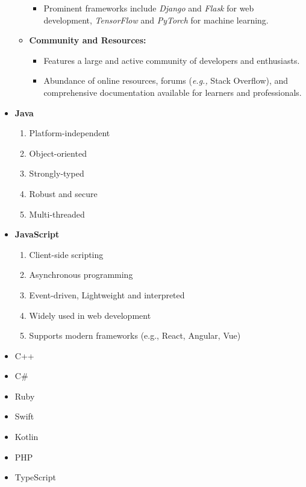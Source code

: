 \documentclass{article}
\begin{document}
\begin{itemize}
\begin{itemize}
\begin{itemize}
                        \item Prominent frameworks include \textit{Django} and \textit{Flask} for web development, \textit{TensorFlow} and \textit{PyTorch} for machine learning.
                    \end{itemize}
              \item \textbf{Community and Resources:}
                    \begin{itemize}
                        \item Features a large and active community of developers and enthusiasts.
                        \item Abundance of online resources, forums (\textit{e.g.,} Stack Overflow), and comprehensive documentation available for learners and professionals.
                    \end{itemize}
          \end{itemize}
          
    \item \textbf {Java}
    \begin{enumerate}[label=\roman*.]
        \item Platform-independent
        \item Object-oriented
        \item Strongly-typed
        \item Robust and secure
        \item Multi-threaded
    \end{enumerate}
    
    \item \textbf {JavaScript}
    \begin{enumerate}[label=\roman*.,start=6]
        \item Client-side scripting
        \item Asynchronous programming
        \item Event-driven, Lightweight and interpreted
        \item Widely used in web development
        \item Supports modern frameworks (e.g., React, Angular, Vue)
    \end{enumerate}
    
    \item C++
    \item C\#
    \item Ruby
    \item Swift
    \item Kotlin
    \item PHP
    \item TypeScript
\end{itemize}
\end{document}
